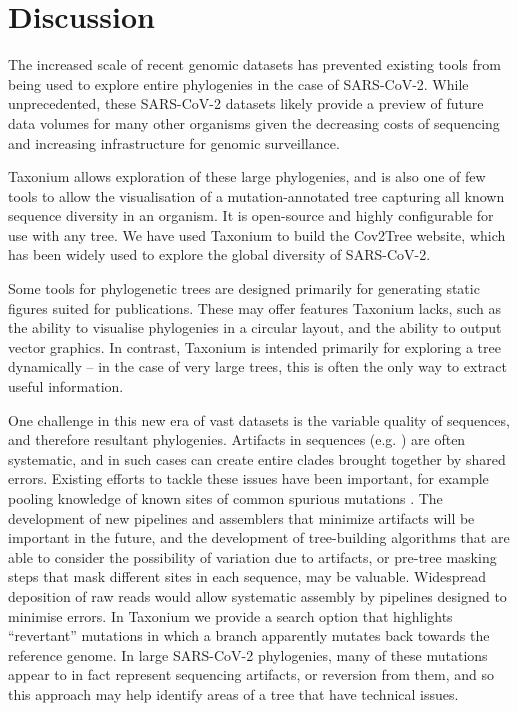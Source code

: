 \section*{Discussion}\label{s:discussion}

The increased scale of recent genomic datasets has prevented existing tools from being used to explore entire phylogenies in the case of SARS-CoV-2. While unprecedented, these SARS-CoV-2 datasets likely provide a preview of future data volumes for many other organisms given the decreasing costs of sequencing and increasing infrastructure for genomic surveillance.

Taxonium allows exploration of these large phylogenies, and is also one of few tools to allow the visualisation of a mutation-annotated tree capturing all known sequence diversity in an organism. It is open-source and highly configurable for use with any tree. We have used Taxonium to build the Cov2Tree website, which has been widely used to explore the global diversity of SARS-CoV-2.

Some tools for phylogenetic trees are designed primarily for generating static figures suited for publications. These may offer features Taxonium lacks, such as the ability to visualise phylogenies in a circular layout, and the ability to output vector graphics. In contrast, Taxonium is intended primarily for exploring a tree dynamically -- in the case of very large trees, this is often the only way to extract useful information.

One challenge in this new era of vast datasets is the variable quality of sequences, and therefore resultant phylogenies. Artifacts in sequences (e.g. \citet{pmid35130474,sanderson2021variation,sanderson2021systematic}) are often systematic, and in such cases can create entire clades brought together by shared errors. Existing efforts to tackle these issues have been important, for example pooling knowledge of known sites of common spurious mutations \citep{de2020masking}. The development of new pipelines and assemblers that minimize artifacts will be important in the future, and the development of tree-building algorithms that are able to consider the possibility of variation due to artifacts, or pre-tree masking steps that mask different sites in each sequence, may be valuable. Widespread deposition of raw reads would allow systematic assembly by pipelines designed to minimise errors. In Taxonium we provide a search option that highlights ``revertant'' mutations in which a branch apparently mutates back towards the reference genome. In large SARS-CoV-2 phylogenies, many of these mutations appear to in fact represent sequencing artifacts, or reversion from them, and so this approach may help identify areas of a tree that  have technical issues. 

